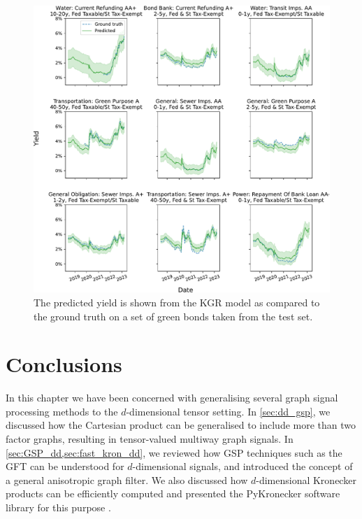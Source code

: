 \begin{figure}[t]  
    \begin{center}
        \includegraphics[width=\linewidth]{Figures/yield_predictions_KGR.pdf}
    \end{center}
   \caption[The output of the KGR model on several green bonds from the test set]{The predicted yield is shown from the KGR model as compared to the ground truth on a set of green bonds taken from the test set. } 
    \label{fig:yield_predictions_KGR}
\end{figure} 

\newpage

\section{Conclusions}

In this chapter we have been concerned with generalising several graph signal processing methods to the $d$-dimensional tensor setting. In \cref{sec:dd_gsp}, we discussed how the Cartesian product can be generalised to include more than two factor graphs, resulting in tensor-valued multiway graph signals. In \cref{sec:GSP_dd,sec:fast_kron_dd}, we reviewed how GSP techniques such as the GFT can be understood for $d$-dimensional signals, and introduced the concept of a general anisotropic graph filter. We also discussed how $d$-dimensional Kronecker products can be efficiently computed and presented the PyKronecker software library for this purpose \citep{Antonian2023}.

